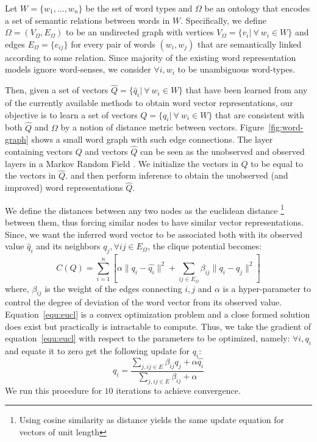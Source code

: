 \documentclass[11pt]{article}
\begin{document}
Let $W = \{w_1,...,w_n\}$ be the set of word types and $\Omega$ be an ontology that encodes a set of semantic relations between words in $W$. 
Specifically, we define $\Omega = (V_\Omega,E_\Omega)$ to be an undirected graph with vertices $V_\Omega = \{v_i | \  \forall \  w_i \in W\}$ and 
edges $E_\Omega = \{e_{ij}\}$ for every pair of words $(w_i,w_j)$ that are semantically linked according to some relation.
Since majority of the existing word representation models ignore word-senses,
we consider $\forall i, w_i$ to be unambiguous word-types.

Then, given a set of vectors $\hat{Q} = \{\hat{q}_i | \  \forall \  w_i \in W\}$ that have been learned from any of the currently available
methods to obtain word vector representations, our objective is to learn a set of vectors $Q = \{q_i | \  \forall \  w_i \in W\}$ that are 
consistent with both $\hat{Q}$ and $\Omega$ by a notion of distance metric between vectors. Figure~\ref{fig:word-graph} shows a small word graph with such edge 
connections. The layer containing vectors $Q$ and vectors $\hat{Q}$ can be seen as the unobserved and observed layers in a Markov Random Field 
\cite{kindermann80mrf}. We initialize the vectors in $Q$ to be equal to the vectors in $\hat{Q}$.
and then perform inference to obtain the unobserved (and improved) word representations $\hat{Q}$.

We define the distances between any two nodes as the euclidean distance
\footnote{Using cosine similarity as distance yields the same update equation for vectors of unit length}
 between them, thus forcing 
similar nodes to have similar vector representations. Since, we want the inferred word vector to be
associated both with its observed value $\hat{q}_i$ and its neighbors 
$q_j, \forall ij \in E_{\Omega}$, the clique potential becomes:
\begin{equation}
  \label{equ:eucl}
  \displaystyle C(Q) = \sum_{i=1}^n \left[ \alpha \lVert q_i - \hat{q_i} \rVert^2 + \sum_{ij \in E_{\Omega}} \beta_{ij} \lVert q_i - q_j \rVert^2 \right]
\end{equation}
where, $\beta_{ij}$ is the weight of the edges connecting $i,j$ and $\alpha$ is a hyper-parameter to control the degree of deviation of the word 
vector from its observed value. Equation~\ref{equ:eucl} is a convex optimization problem and a close formed solution does exist but practically is intractable to compute. Thus, we take the gradient of equation~\ref{equ:eucl} with respect to the parameters to be optimized, namely: $\forall i, q_i$ and equate it to zero get the following update for $q_i$:
\begin{equation}
  \label{equ:update-vector}
q_i = \frac{\sum_{j, ij \in E} \beta_{ij} q_j + \alpha \hat{q_i}}{\sum_{j, ij \in E} \beta_{ij} + \alpha}
\end{equation}
We run this procedure for $10$ iterations to achieve convergence.
\end{document}
